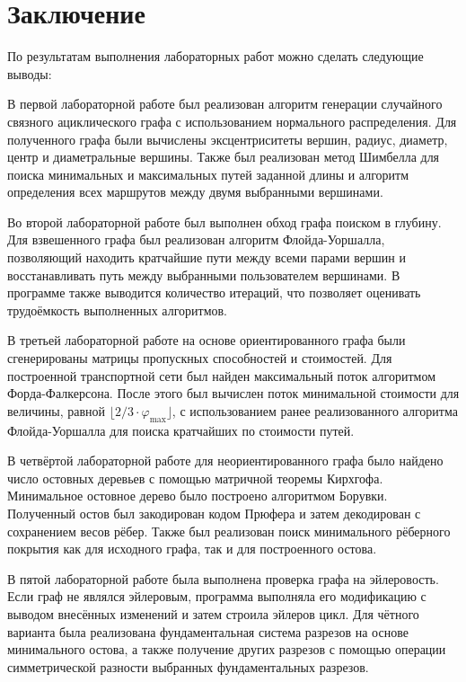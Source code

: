 \documentclass[a4paper,final]{article}
\begin{document}
\clearpage
\section*{Заключение}

По результатам выполнения лабораторных работ можно сделать следующие выводы:

В первой лабораторной работе был реализован алгоритм генерации случайного связного ациклического графа с использованием нормального распределения. Для полученного графа были вычислены эксцентриситеты вершин, радиус, диаметр, центр и диаметральные вершины. Также был реализован метод Шимбелла для поиска минимальных и максимальных путей заданной длины и алгоритм определения всех маршрутов между двумя выбранными вершинами.

Во второй лабораторной работе был выполнен обход графа поиском в глубину. Для взвешенного графа был реализован алгоритм Флойда-Уоршалла, позволяющий находить кратчайшие пути между всеми парами вершин и восстанавливать путь между выбранными пользователем вершинами. В программе также выводится количество итераций, что позволяет оценивать трудоёмкость выполненных алгоритмов.

В третьей лабораторной работе на основе ориентированного графа были сгенерированы матрицы пропускных способностей и стоимостей. Для построенной транспортной сети был найден максимальный поток алгоритмом Форда-Фалкерсона. После этого был вычислен поток минимальной стоимости для величины, равной $\lfloor 2/3 \cdot \varphi_{\max} \rfloor$, с использованием ранее реализованного алгоритма Флойда-Уоршалла для поиска кратчайших по стоимости путей.

В четвёртой лабораторной работе для неориентированного графа было найдено число остовных деревьев с помощью матричной теоремы Кирхгофа. Минимальное остовное дерево было построено алгоритмом Борувки. Полученный остов был закодирован кодом Прюфера и затем декодирован с сохранением весов рёбер. Также был реализован поиск минимального рёберного покрытия как для исходного графа, так и для построенного остова.

В пятой лабораторной работе была выполнена проверка графа на эйлеровость. Если граф не являлся эйлеровым, программа выполняла его модификацию с выводом внесённых изменений и затем строила эйлеров цикл. Для чётного варианта была реализована фундаментальная система разрезов на основе минимального остова, а также получение других разрезов с помощью операции симметрической разности выбранных фундаментальных разрезов.
\end{document}
